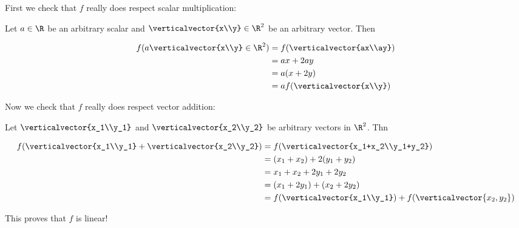 \documentclass{ximera}
\begin{document}
\begin{question}
\begin{solution}
\begin{hint}
\begin{question}
		First we check that $f$ really does respect scalar multiplication:
		
		Let $a \in \R$ be an arbitrary scalar and $\verticalvector{x\\y} \in \R^2$ be an arbitrary vector.  Then
		
		\begin{align*}
		 f(a\verticalvector{x\\y} \in \R^2) &= f(\verticalvector{ax\\ay})\\
		 &= ax+2ay\\
		 &= a(x+2y)\\
		 &=af(\verticalvector{x\\y}) 		
		 \end{align*}
		 
		 Now we check that $f$ really does respect vector addition:
		 
		 Let $\verticalvector{x_1\\y_1}$ and $\verticalvector{x_2\\y_2}$ be arbitrary vectors in $\R^2$.  Thn
		 
		 \begin{align*}
		 f(\verticalvector{x_1\\y_1}+\verticalvector{x_2\\y_2})&= f(\verticalvector{x_1+x_2\\y_1+y_2})\\
		 &= (x_1+x_2)+2(y_1+y_2)\\
		 &= x_1+x_2+2y_1+2y_2\\
		 &=(x_1+2y_1)+(x_2+2y_2)\\
		 &=f(\verticalvector{x_1\\y_1})+f(\verticalvector{x_2,y_2})
		 \end{align*}
		 
		 This proves that $f$ is linear!
		
	\end{question}
	
    \end{hint}

    \begin{multiple-choice}

    \end{multiple-choice}
  \end{solution}


\end{question}
\end{document}
